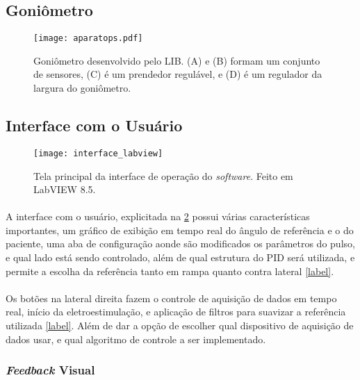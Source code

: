 \subsection{Goniômetro}

\begin{figure}[H]
	\centering
	\texttt{[image: aparatops.pdf]}
	\caption{Goniômetro desenvolvido pelo LIB. (A) e (B) formam um conjunto de sensores, (C) é um prendedor regulável, e (D) é um regulador da largura do goniômetro.}
	\label{fig:aparatops}
\end{figure}

\subsection{Interface com o Usuário}

\begin{figure}[H]
	\centering
	\texttt{[image: interface\_labview]}
	\caption{Tela principal da interface de operação do \textit{software}. Feito em LabVIEW 8.5.}
	\label{fig:interface_labview}
\end{figure}

\paragraph{}A interface com o usuário, explicitada na \ref{fig:interface_labview} possui várias características importantes, um gráfico de exibição em tempo real do ângulo de referência e o do paciente, uma aba de configuração aonde são modificados os parâmetros do pulso, e qual lado está sendo controlado, além de qual estrutura do PID será utilizada, e permite a escolha da referência tanto em rampa quanto contra lateral \ref{label}.

\paragraph{}Os botões na lateral direita fazem o controle de aquisição de dados em tempo real, início da eletroestimulação, e aplicação de filtros para suavizar a referência utilizada \ref{label}. Além de dar a opção de escolher qual dispositivo de aquisição de dados usar, e qual algoritmo de controle a ser implementado.

\subsubsection{\textit{Feedback} Visual}

